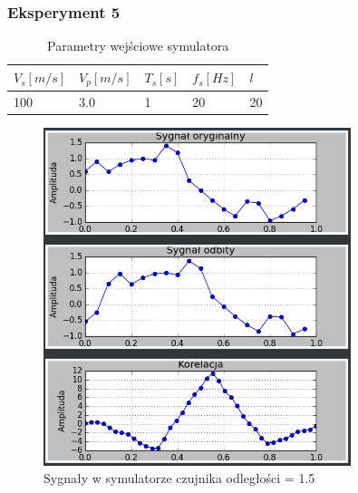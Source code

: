 \documentclass{article}
\begin{document}
{        \subsubsection{Eksperyment 5} {
            \begin{table}[h!]
                \centering
                \begin{tabular}{|l|l|l|l|l|}
                    \hline
                    $V_s[m/s]$ & $V_p[m/s]$ & $T_s[s]$ & $f_s[Hz]$ & $l$ \\ \hline
                    100        & 3.0        & 1        & 20        & 20 \\ \hline
                \end{tabular}
                \caption{Parametry wejściowe symulatora}
            \end{table}
            \begin{figure}[h!]
                \centering
                \includegraphics[width=0.8\textwidth]{img/sim17.png}
                \caption{Sygnały w symulatorze czujnika odległości = 1.5}
            \end{figure}
            \begin{figure}[h!]
                \centering

\end{figure}}}
\end{document}
